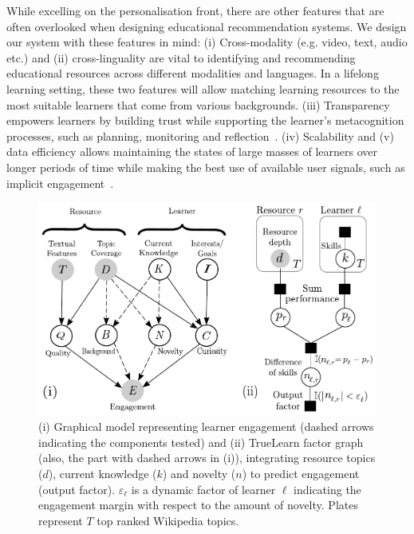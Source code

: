 \documentclass[letterpaper]{article} %
\begin{document}
While excelling on the personalisation front, there are other features that are often overlooked when designing educational recommendation systems. We design our system with these features in mind:
(i) {Cross-modality} (e.g. video, text, audio etc.) and (ii) {cross-linguality} are vital to identifying and recommending educational resources across different modalities and languages. In a lifelong learning setting, these two features will allow matching learning resources to the most suitable learners that come from various backgrounds. (iii) {Transparency} empowers learners by building trust while supporting the learner's metacognition processes, such as planning, monitoring and reflection~\cite{Bull2016}. (iv) {Scalability} and (v) {data efficiency} allows maintaining the states of large masses of learners over longer periods of time while making the best use of available user signals, such as implicit engagement~\cite{Salehi2014}.






































\begin{figure}[!tbp]
\centering
\includegraphics[width=\columnwidth]{./engagement_model_truelearn_model_v3.pdf}
\caption{(i) Graphical model representing learner engagement (dashed arrows indicating the components tested) and (ii) TrueLearn factor graph (also, the part with dashed arrows in (i)), integrating resource topics ($d$), current knowledge ($k$) and novelty ($n$) to predict engagement (output factor). $\varepsilon_\ell$ is a dynamic factor of learner $\ell$ indicating the engagement margin with respect to the amount of novelty. Plates represent $T$ top ranked Wikipedia topics.}
\label{fig:learner_model}
\end{figure}
\end{document}
